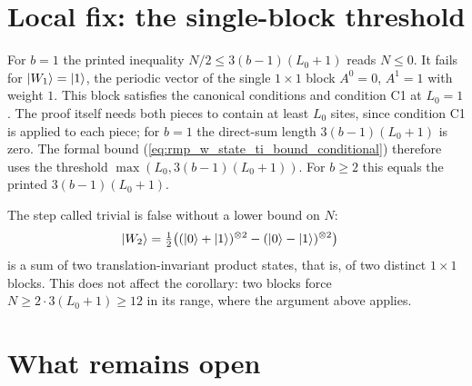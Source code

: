 \documentclass{article}
\begin{document}
\section{Local fix: the single-block threshold}

For $b=1$ the printed inequality $N/2\leq 3(b-1)(L_0+1)$ reads $N\leq0$. It
fails for $|W_1\rangle=|1\rangle$, the periodic vector of the single $1\times1$
block $A^0=0$, $A^1=1$ with weight $1$. This block satisfies the canonical
conditions and condition C1 at $L_0=1$. The proof itself needs both pieces to
contain at least $L_0$ sites, since condition C1 is applied to each piece;
for $b=1$ the direct-sum length $3(b-1)(L_0+1)$ is zero. The formal bound
(\ref{eq:rmp_w_state_ti_bound_conditional}) therefore uses the threshold
$\max(L_0,3(b-1)(L_0+1))$. For $b\geq2$ this equals the printed
$3(b-1)(L_0+1)$.

The step called trivial is false without a lower bound on $N$:
\begin{align}
    |W_2\rangle
     & =
    \tfrac12\bigl((|0\rangle+|1\rangle)^{\otimes2}-(|0\rangle-|1\rangle)^{\otimes2}\bigr)
    \label{eq:rmp_w_state_ti_bound_w_two}
\end{align}
is a sum of two translation-invariant product states, that is, of two distinct
$1\times1$ blocks. This does not affect the corollary: two blocks force
$N\geq 2\cdot3(L_0+1)\geq12$ in its range, where the argument above applies.

\section{What remains open}
\end{document}
